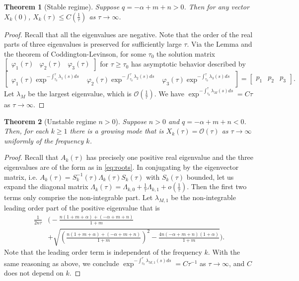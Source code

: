 \documentclass[a4paper,11pt]{article}
\newtheorem{theorem}{Theorem}
\theoremstyle{remark}
\begin{document}
\begin{theorem}[Stable regime]
Suppose $q=-\alpha+m+n>0$. Then for any vector $X_k(0)$, $X_k(\tau) \le C(\frac{1}{\tau})$ as $\tau \rightarrow \infty$. 
\end{theorem}
\begin{proof}
 Recall that all the eigenvalues are negative. Note that the order of the real parts of three eigenvalues is preserved for sufficiently large $\tau$. Via the Lemma and the theorem of Coddington-Levinson, for some $\tau_0$ the solution matrix $\begin{bmatrix} \varphi_1(\tau) & \varphi_2(\tau) & \varphi_3(\tau) \end{bmatrix}$ for $\tau\ge \tau_0$ has asymptotic behavior described by
$$ \begin{bmatrix} \varphi_1(\tau)\exp^{-\int_{\tau_0}^{\tau} \lambda_1(s) ds} & \varphi_2(\tau)\exp^{-\int_{\tau_0}^{\tau} \lambda_2(s) ds} & \varphi_3(\tau)\exp^{-\int_{\tau_0}^{\tau} \lambda_3(s) ds} \end{bmatrix} = \begin{bmatrix} p_1 & p_2 & p_3 \end{bmatrix}.$$
 Let $\lambda_M$ be the largest eigenvalue, which is $\mathcal{O}(\frac{1}{\tau})$. We have $\exp^{-\int_{\tau_0}^{\tau} \lambda_M(s) ds} = C\tau$ as $\tau \rightarrow \infty$.
\end{proof}
\begin{theorem}[Unstable regime $n>0$] Suppose $n>0$ and $q=-\alpha+m+n<0$. Then, for each $k\ge1$ there is a growing mode that is  $X_k(\tau) =\mathcal{O}(\tau)$ as $\tau \rightarrow \infty$ uniformly of the frequency $k$.
\end{theorem}
\begin{proof}
 Recall that $A_k(\tau)$ has precisely one positive real eigenvalue and the three eigenvalues are of the form as in \eqref{eq:roots}. In conjugating by the eigenvector matrix, i.e. $A_k(\tau) = S^{-1}_k(\tau)\Lambda_k(\tau) S_k(\tau)$ with $S_k(\tau)$ bounded, let us expand the diagonal matrix $\Lambda_k(\tau)= \Lambda_{k,0}+ \frac{1}{\tau}\Lambda_{k,1} + o(\frac{1}{\tau})$. Then the first two terms only comprise the non-integrable part. Let $\lambda_{M,1}$ be the non-integrable leading order part of the positive eigenvalue that is
 \begin{align*}
\frac{1}{2n\tau}&\Bigg( - \frac{n(1+m+\alpha) + (-\alpha+m+n)}{1+m} \\
 &+ \sqrt{\left(\frac{n(1+m+\alpha) + (-\alpha+m+n)}{1+m}\right)^2 -\frac{4n(-\alpha+m+n)(1+\alpha)}{1+m}}\Bigg).  
 \end{align*}
 Note that the leading order term is independent of the frequency $k$. With the same reasoning as above, we conclude $\exp^{-\int_{\tau_0}^{\tau} \lambda_{M,1}(s) ds} = C\tau^{-1}$ as $\tau \rightarrow \infty$, and $C$ does not depend on $k$.
\end{proof}
\end{document}
